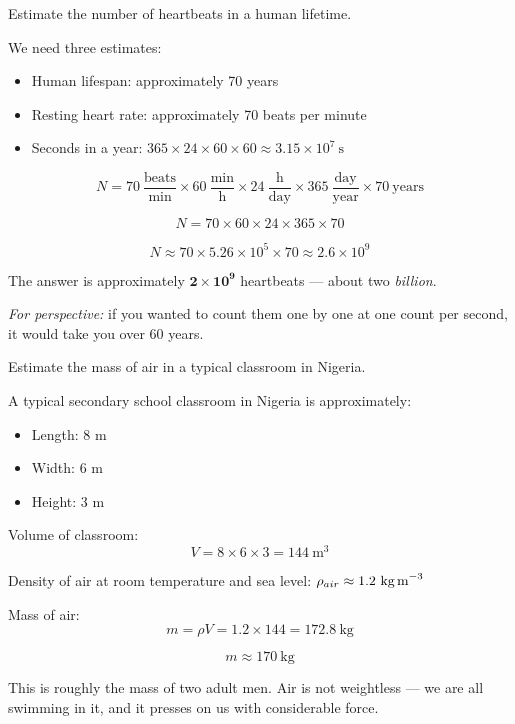 \begin{examplebox}[1.9]
Estimate the number of heartbeats in a human lifetime.
\end{examplebox}

\begin{solutionbox}
We need three estimates:
\begin{itemize}
  \item Human lifespan: approximately 70 years
  \item Resting heart rate: approximately 70 beats per minute
  \item Seconds in a year: $365 \times 24 \times 60 \times 60
  \approx 3.15 \times 10^7\ \text{s}$
\end{itemize}

\[
  N = 70\ \frac{\text{beats}}{\text{min}}
  \times 60\ \frac{\text{min}}{\text{h}}
  \times 24\ \frac{\text{h}}{\text{day}}
  \times 365\ \frac{\text{day}}{\text{year}}
  \times 70\ \text{years}
\]

\[
  N = 70 \times 60 \times 24 \times 365 \times 70
\]

\[
  N \approx 70 \times 5.26 \times 10^5 \times 70
  \approx 2.6 \times 10^9
\]

The answer is approximately $\mathbf{2 \times 10^9}$
heartbeats --- about two \textit{billion}.

\textit{For perspective:} if you wanted to count them one
by one at one count per second, it would take you over
60 years.
\end{solutionbox}

\begin{examplebox}[1.10]
Estimate the mass of air in a typical classroom in Nigeria.
\end{examplebox}

\begin{solutionbox}
A typical secondary school classroom in Nigeria is
approximately:
\begin{itemize}
  \item Length: 8 m
  \item Width: 6 m
  \item Height: 3 m
\end{itemize}

Volume of classroom:
\[
  V = 8 \times 6 \times 3 = 144\ \text{m}^3
\]

Density of air at room temperature and sea level:
$\rho_{air} \approx 1.2\ \text{kg\,m}^{-3}$

Mass of air:
\[
  m = \rho V = 1.2 \times 144 = 172.8\ \text{kg}
\]

\[
  \boxed{m \approx 170\ \text{kg}}
\]

This is roughly the mass of two adult men. Air is not
weightless --- we are all swimming in it, and it presses
on us with considerable force.
\end{solutionbox}

